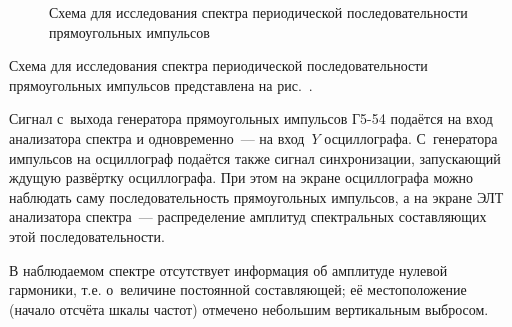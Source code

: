 
\experiment
\begin{figure}[h!]
	\centering
	\caption{Схема для исследования спектра периодической последовательности прямоугольных импульсов}
\end{figure}

Схема для исследования спектра периодической последовательности прямоугольных импульсов представлена на рис.~.

Сигнал с~выхода генератора прямоугольных импульсов Г5-54 подаётся на вход анализатора спектра и одновременно~--- на вход~$Y$ осциллографа. С~генератора импульсов на осциллограф подаётся также сигнал синхронизации, запускающий ждущую развёртку осциллографа. При этом на экране осциллографа можно наблюдать саму последовательность прямоугольных импульсов, а на экране ЭЛТ анализатора спектра~--- распределение амплитуд спектральных составляющих этой последовательности.

В наблюдаемом спектре отсутствует информация об амплитуде нулевой гармоники, т.е. о~величине постоянной составляющей; её местоположение (начало отсчёта шкалы частот) отмечено небольшим вертикальным выбросом.

